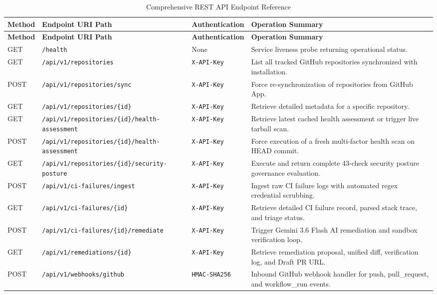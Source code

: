 \documentclass[12pt,a4paper,oneside]{report}
\begin{document}
\begin{longtable}{p{} p{} p{} p{}}
\caption{Comprehensive REST API Endpoint Reference} \label{tab:app-api-reference} \\
\toprule
\textbf{Method} & \textbf{Endpoint URI Path} & \textbf{Authentication} & \textbf{Operation Summary} \\
\midrule
\endfirsthead
\toprule
\textbf{Method} & \textbf{Endpoint URI Path} & \textbf{Authentication} & \textbf{Operation Summary} \\
\midrule
\endhead
\bottomrule
\endfoot
\bottomrule
\endlastfoot

GET & \texttt{/health} & None & Service liveness probe returning operational status. \\
\addlinespace
GET & \texttt{/api/v1/repositories} & \texttt{X-API-Key} & List all tracked GitHub repositories synchronized with installation. \\
\addlinespace
POST & \texttt{/api/v1/repositories/sync} & \texttt{X-API-Key} & Force re-synchronization of repositories from GitHub App. \\
\addlinespace
GET & \texttt{/api/v1/repositories/\{id\}} & \texttt{X-API-Key} & Retrieve detailed metadata for a specific repository. \\
\addlinespace
GET & \texttt{/api/v1/repositories/\{id\}/health-assessment} & \texttt{X-API-Key} & Retrieve latest cached health assessment or trigger live tarball scan. \\
\addlinespace
POST & \texttt{/api/v1/repositories/\{id\}/health-assessment} & \texttt{X-API-Key} & Force execution of a fresh multi-factor health scan on HEAD commit. \\
\addlinespace
GET & \texttt{/api/v1/repositories/\{id\}/security-posture} & \texttt{X-API-Key} & Execute and return complete 43-check security posture governance evaluation. \\
\addlinespace
POST & \texttt{/api/v1/ci-failures/ingest} & \texttt{X-API-Key} & Ingest raw CI failure logs with automated regex credential scrubbing. \\
\addlinespace
GET & \texttt{/api/v1/ci-failures/\{id\}} & \texttt{X-API-Key} & Retrieve detailed CI failure record, parsed stack trace, and triage status. \\
\addlinespace
POST & \texttt{/api/v1/ci-failures/\{id\}/remediate} & \texttt{X-API-Key} & Trigger Gemini 3.6 Flash AI remediation and sandbox verification loop. \\
\addlinespace
GET & \texttt{/api/v1/remediations/\{id\}} & \texttt{X-API-Key} & Retrieve remediation proposal, unified diff, verification log, and Draft PR URL. \\
\addlinespace
POST & \texttt{/api/v1/webhooks/github} & \texttt{HMAC-SHA256} & Inbound GitHub webhook handler for push, pull\_request, and workflow\_run events. \\
\end{longtable}
\end{document}
